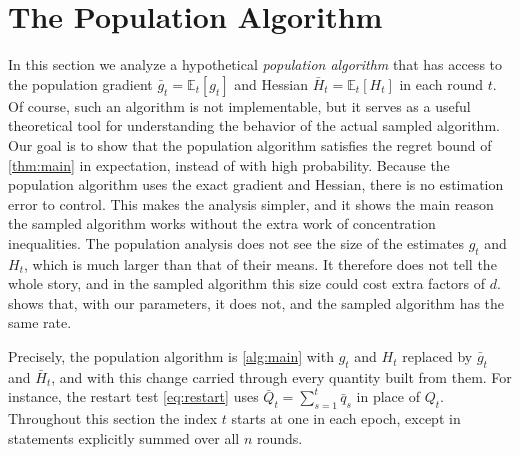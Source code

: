 \documentclass[12pt,cleveref]{jmlr}
\newcommand{\E}{\mathbb E}
\newcommand{\1}{\mathbf 1}
\newcommand{\tor}[1]{\todo[color=red!20,size=\tiny]{Tor: #1}}
\begin{document}
\section{The Population Algorithm}
\label{pop:section}
\suppressfloats[t]
In this section we analyze a hypothetical \textit{population algorithm} that has access to the population gradient $\bar g_t = \E_t[g_t]$ and Hessian $\bar H_t = \E_t[H_t]$ in each round $t$.
Of course, such an algorithm is not implementable, but it serves as a useful theoretical tool for understanding the behavior of the actual sampled algorithm.
Our goal is to show that the population algorithm satisfies the regret bound of \cref{thm:main} in expectation, instead of with high probability.
Because the population algorithm uses the exact gradient and Hessian, there is no estimation error to control. This makes the analysis simpler, and it shows the main reason the sampled algorithm works without the extra work of concentration inequalities.
The population analysis does not see the size of the estimates $g_t$ and
$H_t$, which is much larger than that of their means. It therefore does not
tell the whole story, and in the sampled algorithm this size could cost
extra factors of $d$.  shows that, with our
parameters, it does not, and the sampled algorithm has the same rate.

Precisely, the population algorithm is \cref{alg:main} with $g_t$ and $H_t$ replaced by $\bar g_t$ and $\bar H_t$, and with this change carried through every quantity built from them.
For instance, the restart test \cref{eq:restart} uses $\bar Q_t=\sum_{s=1}^t\bar q_s$ in place of $Q_t$.
Throughout this section the index $t$ starts at one in each epoch, except in statements explicitly summed over all $n$ rounds.
\end{document}
